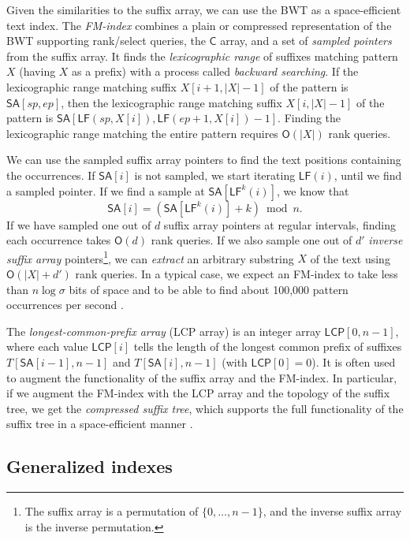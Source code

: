 \documentclass[a4paper,UKenglish]{lipics-v2016}
\newcommand{\set}[1]{\ensuremath{\{ #1 \}}}
\newcommand{\abs}[1]{\ensuremath{\lvert #1 \rvert}}
\newcommand{\Oh}[1]{\ensuremath{\mathsf{O}\!\left( #1 \right)}}
\newcommand{\LF}{\ensuremath{\mathsf{LF}}}
\newcommand{\FMindex}{FM\nobreakdash-index}
\newcommand{\SA}{\ensuremath{\mathsf{SA}}}
\newcommand{\Carray}{\ensuremath{\mathsf{C}}}
\newcommand{\LCP}{\ensuremath{\mathsf{LCP}}}
\begin{document}
Given the similarities to the suffix array, we can use the BWT as a space-efficient text index. The \emph{\FMindex} \cite{Ferragina2005a} combines a plain or compressed representation of the BWT supporting rank/select queries, the $\Carray$ array, and a set of \emph{sampled pointers} from the suffix array. It finds the \emph{lexicographic range} of suffixes matching pattern $X$ (having $X$ as a prefix) with a process called \emph{backward searching}. If the lexicographic range matching suffix $X[i+1, \abs{X}-1]$ of the pattern is $\SA[sp, ep]$, then the lexicographic range matching suffix $X[i, \abs{X}-1]$ of the pattern is $\SA[\LF(sp, X[i]), \LF(ep+1, X[i]) - 1]$. Finding the lexicographic range matching the entire pattern requires $\Oh{\abs{X}}$ rank queries.

We can use the sampled suffix array pointers to find the text positions containing the occurrences. If $\SA[i]$ is not sampled, we start iterating $\LF(i)$, until we find a sampled pointer. If we find a sample at $\SA[\LF^{k}(i)]$, we know that
$$
\SA[i] = (\SA[\LF^{k}(i)] + k) \bmod n.
$$
If we have sampled one out of $d$ suffix array pointers at regular intervals, finding each occurrence takes $\Oh{d}$ rank queries. If we also sample one out of $d'$ \emph{inverse suffix array} pointers\footnote{The suffix array is a permutation of $\set{0, \dotsc, n-1}$, and the inverse suffix array is the inverse permutation.}, we can \emph{extract} an arbitrary substring $X$ of the text using $\Oh{\abs{X}+d'}$ rank queries. In a typical case, we expect an \FMindex{} to take less than $n \log \sigma$ bits of space and to be able to find about 100,000 pattern occurrences per second \cite{Ferragina2009a}.

The \emph{longest-common-prefix array} (LCP array) \cite{Manber1993} is an integer array $\LCP[0, n-1]$, where each value $\LCP[i]$ tells the length of the longest common prefix of suffixes $T[\SA[i-1], n-1]$ and $T[\SA[i], n-1]$ (with $\LCP[0] = 0$). It is often used to augment the functionality of the suffix array and the \FMindex. In particular, if we augment the \FMindex{} with the LCP array and the topology of the suffix tree, we get the \emph{compressed suffix tree}, which supports the full functionality of the suffix tree in a space-efficient manner \cite{Sadakane2007}.

\subsection{Generalized indexes}
\end{document}
